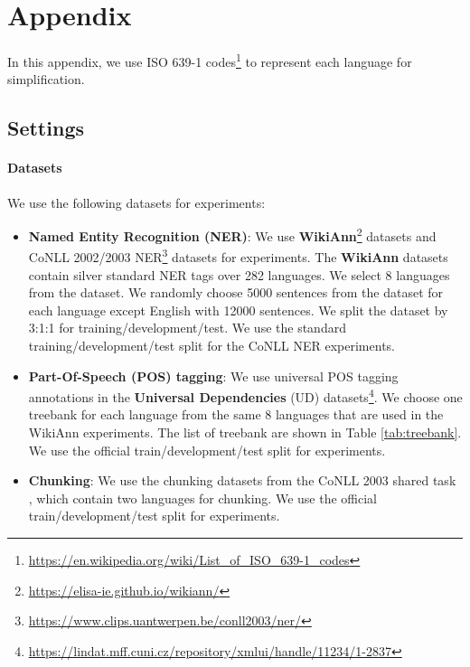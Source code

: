 \documentclass[11pt,a4paper]{article}
\begin{document}






\appendix

\section{Appendix}
In this appendix, we use ISO 639-1 codes\footnote{\url{https://en.wikipedia.org/wiki/List_of_ISO_639-1_codes}} to represent each language for simplification.
\subsection{Settings}
\paragraph{Datasets}
We use the following datasets for experiments:
\begin{itemize}
\item \textbf{Named Entity Recognition (NER)}: We use \textbf{{\bf WikiAnn}}\footnote{\url{https://elisa-ie.github.io/wikiann/}} \cite{pan-etal-2017-cross} datasets and CoNLL 2002/2003 NER\footnote{\url{https://www.clips.uantwerpen.be/conll2003/ner/}} \cite{tjong-kim-sang-2002-introduction,tjong-kim-sang-de-meulder-2003-introduction} datasets  for experiments. The {\bf WikiAnn} datasets contain silver standard NER tags over 282 languages. We select 8 languages from the dataset. We randomly choose 5000 sentences from the dataset for each language except English with 12000 sentences. We split the dataset by 3:1:1 for training/development/test. We use the standard training/development/test split for the CoNLL NER experiments.
    \item \textbf{Part-Of-Speech (POS) tagging}: We use universal POS tagging annotations in the {\bf Universal Dependencies} (UD) \cite{nivre-etal-2016-universal} datasets\footnote{\url{https://lindat.mff.cuni.cz/repository/xmlui/handle/11234/1-2837}}. We choose one treebank for each language from the same 8 languages that are used in the WikiAnn experiments. The list of treebank are shown in Table \ref{tab:treebank}. We use the official train/development/test split for experiments.
    \item \textbf{Chunking}: We use the chunking datasets from the CoNLL 2003 shared task \cite{tjong-kim-sang-de-meulder-2003-introduction}, which contain two languages for chunking. We use the official train/development/test split for experiments.
\end{itemize}
\end{document}
